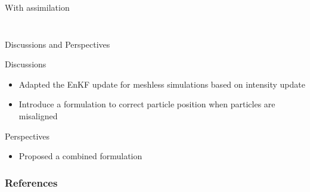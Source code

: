 \documentclass[aspectratio=169]{beamer} %
\begin{document}
\begin{frame}{With assimilation}
\begin{columns}
\begin{column}{0.5\textwidth}
\begin{figure}
\begin{subfigure}{\textwidth}
                \end{subfigure}
            \end{figure}
        \end{column}
    \end{columns}
\end{frame}

\begin{frame}{Discussions and Perspectives}

    \begin{block}{Discussions}
        \begin{itemize}
            \item Adapted the EnKF update for meshless simulations based on intensity update
            \item Introduce a formulation to correct particle position when particles are misaligned
        \end{itemize}
    \end{block}

    \begin{block}{Perspectives}
        \begin{itemize}
            \item Proposed a combined formulation
        \end{itemize}
    \end{block}
\end{frame}

\closingframe

\begin{frame}
    \frametitle{References}
    \printbibliography %
\end{frame}

\end{document}
